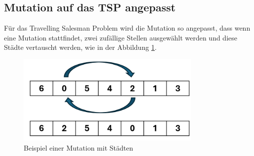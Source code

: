 \subsection{Mutation auf das TSP angepasst
\label{buch:paper:varalg:subsection:mutation_tsp}}
Für das Travelling Salesman Problem wird die Mutation so angepasst,
dass wenn eine Mutation stattfindet, zwei zufällige Stellen ausgewählt
werden und diese Städte vertauscht werden, 
wie in der Abbildung \ref{fig:mutation_genetic_string_cities}.
\begin{figure}
	\centering
	\includegraphics[width=0.8\textwidth]{
        papers/varalg/images/teil3/09GeneticStringCitiesMutation.png
        }
	\caption{Beispiel einer Mutation mit Städten}
	\label{fig:mutation_genetic_string_cities}
\end{figure}

